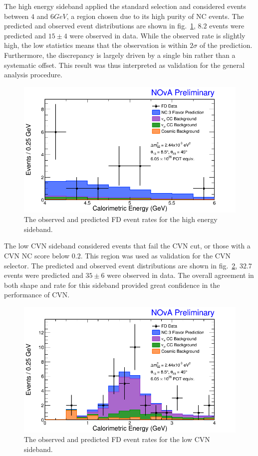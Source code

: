The high energy sideband applied the standard selection and considered events between $4$ and $6\unit{GeV}$, a region chosen due to its high purity of NC events. The predicted and observed event distributions are shown in fig.~\ref{fig:SidebandHighE}, $8.2$ events were predicted and $15 \pm 4$ were observed in data. While the observed rate is slightly high, the low statistics means that the observation is within $2\sigma$ of the prediction. Furthermore, the discrepancy is largely driven by a single bin rather than a systematic offset. This result was thus interpreted as validation for the general analysis procedure.
\begin{figure}[htbp]
  \centering
  \includegraphics[width=1\textwidth]{figures/Ana01Results/FDHighECalEDataMCStack.png}
  \caption[High Energy Sideband]{The observed and predicted FD event rates for the high energy sideband.}
  \label{fig:SidebandHighE}
\end{figure}

The low CVN sideband considered events that fail the CVN cut, or those with a CVN NC score below $0.2$. This region was used as validation for the CVN selector. The predicted and observed event distributions are shown in fig.~\ref{fig:SidebandLowCVN}, $32.7$ events were predicted and $35 \pm 6$ were observed in data. The overall agreement in both shape and rate for this sideband provided great confidence in the performance of CVN.
\begin{figure}[htbp]
  \centering
  \includegraphics[width=1\textwidth]{figures/Ana01Results/FDLowCVNCalEDataMCStack.png}
  \caption[Low CVN Sideband]{The observed and predicted FD event rates for the low CVN sideband.}
  \label{fig:SidebandLowCVN}
\end{figure}

